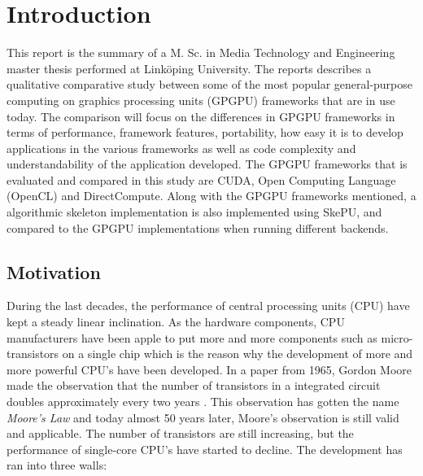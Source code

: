 
\chapter{Introduction}  %
This report is the summary of a M. Sc. in Media Technology and Engineering master thesis performed at Linköping University. The reports describes a qualitative comparative study between some of the most popular general-purpose computing on graphics processing units (GPGPU) frameworks that are in use today. The comparison will focus on the differences in GPGPU frameworks in terms of performance, framework features, portability, how easy it is to develop applications in the various frameworks as well as code complexity and understandability of the application developed. The GPGPU frameworks that is evaluated and compared in this study are CUDA, Open Computing Language (OpenCL) and DirectCompute. Along with the GPGPU frameworks mentioned, a algorithmic skeleton implementation is also implemented using SkePU, and compared to the GPGPU implementations when running different backends.


\section{Motivation} \label{sec:IntroductionMotivation}
During the last decades, the performance of central processing units (CPU) have kept a steady linear inclination. As the hardware components, CPU manufacturers have been apple to put more and more components such as micro-transistors on a single chip which is the reason why the development of more and more powerful CPU's have been developed. In a paper from 1965, Gordon Moore made the observation that the number of transistors in a integrated circuit doubles approximately every two years \cite{MooresLaw}. This observation has gotten the name \textit{Moore's Law} and today almost 50 years later, Moore's observation is still valid and applicable. The number of transistors are still increasing, but the performance of single-core CPU's have started to decline. The development has ran into three walls:

